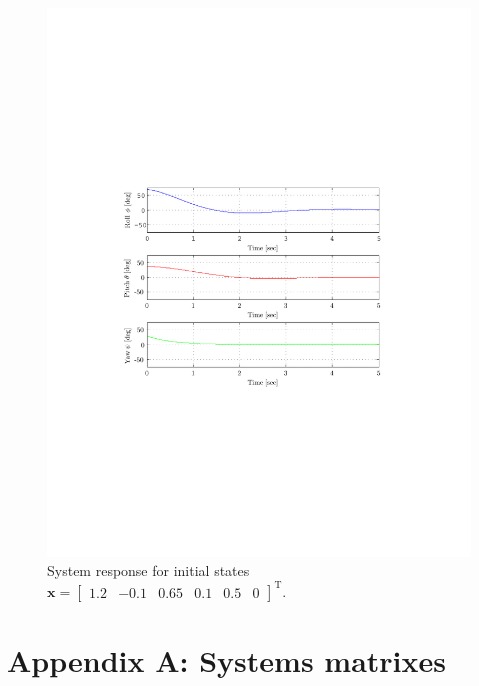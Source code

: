 \documentclass[12pt]{article}
\begin{document}
\begin{figure}
  \centering
  \includegraphics{lqg.pdf}
  \caption{System response for initial states $\mathbf{x} = \begin{bmatrix} 1.2 & -0.1 & 0.65 & 0.1 & 0.5 & 0 \end{bmatrix}^\mathrm{T} $.}
  \label{fig:control}
\end{figure}

\section{Appendix A: Systems matrixes}
\end{document}

